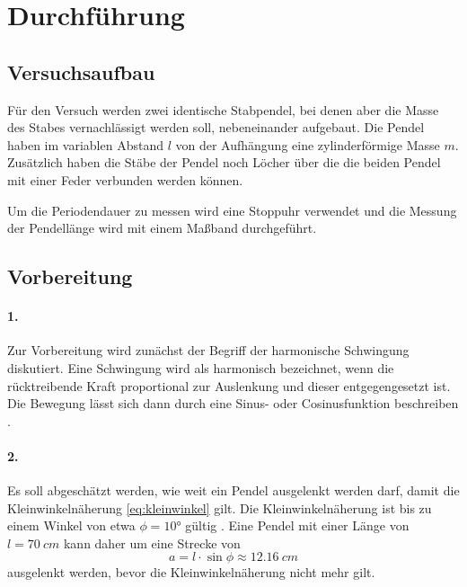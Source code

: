 \section{Durchführung}
\label{sec:Durchführung}
\subsection{Versuchsaufbau}
Für den Versuch werden zwei identische Stabpendel, bei denen aber die Masse des Stabes vernachlässigt werden soll, nebeneinander aufgebaut. Die Pendel haben im variablen Abstand $l$ von der Aufhängung eine zylinderförmige Masse $m$.
Zusätzlich haben die Stäbe der Pendel noch Löcher über die die beiden Pendel mit einer Feder verbunden werden können.

Um die Periodendauer zu messen wird eine Stoppuhr verwendet und die Messung der Pendellänge wird mit einem Maßband durchgeführt.
\subsection{Vorbereitung}
\label{sec:Vorbereitung}
\paragraph{1.} Zur Vorbereitung wird zunächst der Begriff der harmonische Schwingung diskutiert. Eine Schwingung wird als harmonisch bezeichnet, wenn die rücktreibende Kraft proportional zur 
Auslenkung und dieser entgegengesetzt ist. Die Bewegung lässt sich dann durch eine Sinus- oder Cosinusfunktion beschreiben \cite{demtroeder}.
\paragraph{2.} Es soll abgeschätzt werden, wie weit ein Pendel ausgelenkt werden darf, damit die Kleinwinkelnäherung \eqref{eq:kleinwinkel}
gilt. Die Kleinwinkelnäherung ist bis zu einem Winkel von etwa $\phi = \ang{10}$ gültig \cite{demtroeder}. Eine Pendel mit einer Länge von $l = \SI{70}{cm}$ kann daher um eine Strecke von
\begin{equation*}
    a = l \cdot \sin{\phi} \approx \SI{12.16}{cm}
\end{equation*}
ausgelenkt werden, bevor die Kleinwinkelnäherung nicht mehr gilt.

